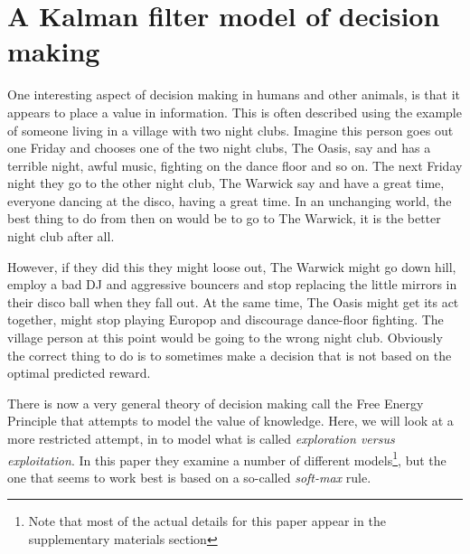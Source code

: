 \documentclass[12pt]{article}
\begin{document}
\section*{A Kalman filter model of decision making}

One interesting aspect of decision making in humans and other animals,
is that it appears to place a value in information. This is often
described using the example of someone living in a village with two
night clubs. Imagine this person goes out one Friday and chooses one
of the two night clubs, The Oasis, say and has a terrible night, awful
music, fighting on the dance floor and so on. The next Friday night
they go to the other night club, The Warwick say and have a great
time, everyone dancing at the disco, having a great time. In an
unchanging world, the best thing to do from then on would be to go to
The Warwick, it is the better night club after all. 

However, if they did this they might loose out, The Warwick might go
down hill, employ a bad DJ and aggressive bouncers and stop replacing
the little mirrors in their disco ball when they fall out. At the same
time, The Oasis might get its act together, might stop playing Europop
and discourage dance-floor fighting. The village person at this point
would be going to the wrong night club. Obviously the correct thing to
do is to sometimes make a decision that is not based on the optimal
predicted reward.

There is now a very general theory of decision making call the Free
Energy Principle that attempts to model the value of knowledge. Here,
we will look at a more restricted attempt, in \citet{DawEtAl2006} to
model what is called \textsl{exploration versus exploitation}. In this
paper they examine a number of different models\footnote{Note that
  most of the actual details for this paper appear in the
  supplementary materials section}, but the one that seems to work
best is based on a so-called \textsl{soft-max} rule.
\end{document}
